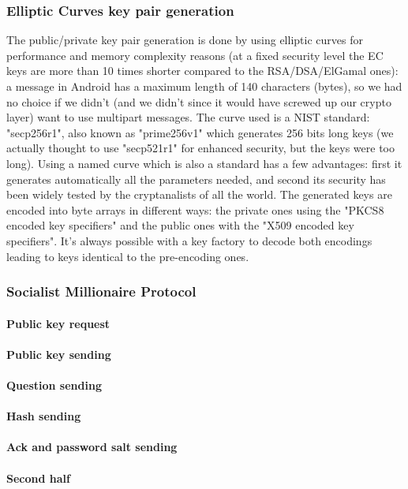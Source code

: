 \documentclass[a4paper,12pt]{article}
\begin{document}
\subsubsection{Elliptic Curves key pair generation}
The public/private key pair generation is done by using elliptic curves for performance and memory complexity reasons (at a fixed security level the EC keys are more than 10 times shorter compared to the RSA/DSA/ElGamal ones): a message in Android has a maximum length of 140 characters (bytes), so we had no choice if we didn't (and we didn't since it would have screwed up our crypto layer) want to use multipart messages. The curve used is a NIST standard: "secp256r1", also known as "prime256v1" which generates 256 bits long keys (we actually thought to use "secp521r1" for enhanced security, but the keys were too long). Using a named curve which is also a standard has a few advantages: first it generates automatically all the parameters needed, and second its security has been widely tested by the cryptanalists of all the world. The generated keys are encoded into byte arrays in different ways: the private ones using the "PKCS8 encoded key specifiers" and the public ones with the "X509 encoded key specifiers". It's always possible with a key factory to decode
both encodings leading to keys identical to the pre-encoding ones.
\subsubsection{Socialist Millionaire Protocol}
\paragraph{Public key request}
\paragraph{Public key sending}
\paragraph{Question sending}
\paragraph{Hash sending}
\paragraph{Ack and password salt sending}
\paragraph{Second half}
\end{document}
